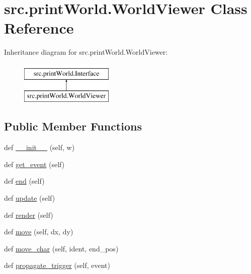 \hypertarget{classsrc_1_1print_world_1_1_world_viewer}{}\section{src.\+print\+World.\+World\+Viewer Class Reference}
\label{classsrc_1_1print_world_1_1_world_viewer}
Inheritance diagram for src.\+print\+World.\+World\+Viewer\+:\begin{figure}[H]
\begin{center}
\leavevmode
\includegraphics[height=2.000000cm]{classsrc_1_1print_world_1_1_world_viewer}
\end{center}
\end{figure}
\subsection*{Public Member Functions}
\begin{DoxyCompactItemize}
\item 
def \hyperlink{classsrc_1_1print_world_1_1_world_viewer_a952dbc8118e5dfa003f6154426aff670}{\+\_\+\+\_\+init\+\_\+\+\_\+} (self, w)
\item 
def \hyperlink{classsrc_1_1print_world_1_1_world_viewer_a9fe50be5fc7237f38e87c0917091116f}{get\+\_\+event} (self)
\item 
def \hyperlink{classsrc_1_1print_world_1_1_world_viewer_a14ac500624dec54f806b82a9c193cd29}{end} (self)
\item 
def \hyperlink{classsrc_1_1print_world_1_1_world_viewer_ab012a6333d30acb4979ed509337e6de6}{update} (self)
\item 
def \hyperlink{classsrc_1_1print_world_1_1_world_viewer_a6a7b47cde8e50e7aee5b04b986987107}{render} (self)
\item 
def \hyperlink{classsrc_1_1print_world_1_1_world_viewer_a8fd85551d968fa3bdab94f6b8e233bd3}{move} (self, dx, dy)
\item 
def \hyperlink{classsrc_1_1print_world_1_1_world_viewer_adb99e3c49a946770c248a7328a4e41fa}{move\+\_\+char} (self, ident, end\+\_\+pos)
\item 
def \hyperlink{classsrc_1_1print_world_1_1_world_viewer_aa88c0d542161c9bbd5415f80c339d183}{propagate\+\_\+trigger} (self, event)
\end{DoxyCompactItemize}
